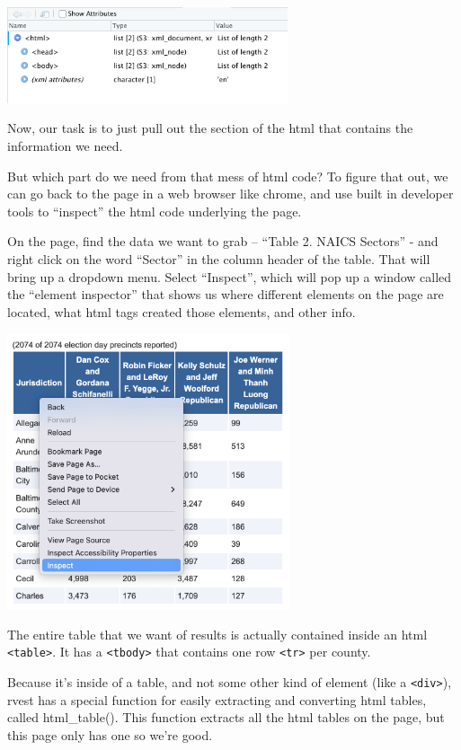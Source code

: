 \documentclass[
  letterpaper,
  DIV=11,
  numbers=noendperiod]{scrreprt}
\begin{document}
\includegraphics[width=3.25in,height=\textheight]{./images/rvest3.png}

Now, our task is to just pull out the section of the html that contains
the information we need.

But which part do we need from that mess of html code? To figure that
out, we can go back to the page in a web browser like chrome, and use
built in developer tools to ``inspect'' the html code underlying the
page.

On the page, find the data we want to grab -- ``Table 2. NAICS Sectors''
- and right click on the word ``Sector'' in the column header of the
table. That will bring up a dropdown menu. Select ``Inspect'', which
will pop up a window called the ``element inspector'' that shows us
where different elements on the page are located, what html tags created
those elements, and other info.

\includegraphics[width=3.27in,height=\textheight]{./images/rvest4.png}

The entire table that we want of results is actually contained inside an
html \texttt{\textless{}table\textgreater{}}. It has a
\texttt{\textless{}tbody\textgreater{}} that contains one row
\texttt{\textless{}tr\textgreater{}} per county.

Because it's inside of a table, and not some other kind of element (like
a \texttt{\textless{}div\textgreater{}}), rvest has a special function
for easily extracting and converting html tables, called html\_table().
This function extracts all the html tables on the page, but this page
only has one so we're good.
\end{document}
